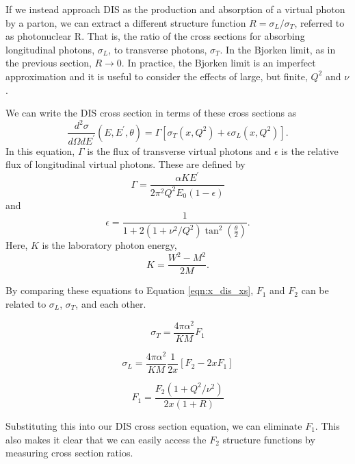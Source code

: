 If we instead approach DIS as the production and absorption of a virtual photon by a parton, we can extract a different structure function $R=\sigma_L/\sigma_T$, referred to as photonuclear R. That is, the ratio of the cross sections for absorbing longitudinal photons, $\sigma_L$, to transverse photons, $\sigma_T$. In the Bjorken limit, as in the previous section, $R\rightarrow 0$. In practice, the Bjorken limit is an imperfect approximation and it is useful to consider the effects of large, but finite, $Q^2$ and $\nu$.

We can write the DIS cross section in terms of these cross sections as
\begin{equation}
	\frac{d^2\sigma}{d\Omega dE^\prime}\left(E,E^\prime,\theta\right) = \Gamma\left[\sigma_T\left(x,Q^2\right)+\epsilon\sigma_L\left(x,Q^2\right)\right].
\end{equation}
In this equation, $\Gamma$ is the flux of transverse virtual photons and $\epsilon$ is the relative flux of longitudinal virtual photons. These are defined by
\begin{equation}
	\Gamma = \frac{\alpha KE^\prime}{2\pi^2Q^2E_0\left(1-\epsilon\right)}
\end{equation}
and
\begin{equation}
	\epsilon = \frac{1}{1+2\left(1+\nu^2/Q^2\right)\tan^2\left(\frac{\theta}{2}\right)}.
\end{equation}
Here, $K$ is the laboratory photon energy,
\begin{equation}
	K = \frac{W^2-M^2}{2M}.
\end{equation}

By comparing these equations to Equation \ref{eqn:x_dis_xs}, $F_1$ and $F_2$ can be related to $\sigma_L$, $\sigma_T$, and each other.

\begin{equation}
	\sigma_T = \frac{4\pi\alpha^2}{KM} F_1
\end{equation}

\begin{equation}
	\sigma_L = \frac{4\pi\alpha^2}{KM}\frac{1}{2x}\left[F_2 - 2xF_1\right]
\end{equation}

\begin{equation}
	F_1 = \frac{F_2\left(1+Q^2/\nu^2\right)}{2x\left(1+R\right)}
\end{equation}

Substituting this into our DIS cross section equation, we can eliminate $F_1$. This also makes it clear that we can easily access the $F_2$ structure functions by measuring cross section ratios.

